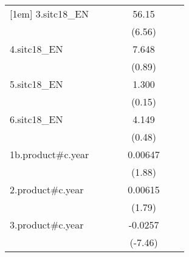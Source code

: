 {\begin{tabular}{l*{6}{c}}
[1em]
3.sitc18\_EN         &                     &                     &                     &       56.15\sym{***}&                     &                     \\
                    &                     &                     &                     &      (6.56)         &                     &                     \\
[1em]
4.sitc18\_EN         &                     &                     &                     &       7.648         &                     &                     \\
                    &                     &                     &                     &      (0.89)         &                     &                     \\
[1em]
5.sitc18\_EN         &                     &                     &                     &       1.300         &                     &                     \\
                    &                     &                     &                     &      (0.15)         &                     &                     \\
[1em]
6.sitc18\_EN         &                     &                     &                     &       4.149         &                     &                     \\
                    &                     &                     &                     &      (0.48)         &                     &                     \\
[1em]
1b.product#c.year   &                     &                     &                     &     0.00647         &                     &                     \\
                    &                     &                     &                     &      (1.88)         &                     &                     \\
[1em]
2.product#c.year    &                     &                     &                     &     0.00615         &                     &                     \\
                    &                     &                     &                     &      (1.79)         &                     &                     \\
[1em]
3.product#c.year    &                     &                     &                     &     -0.0257\sym{***}&                     &                     \\
                    &                     &                     &                     &     (-7.46)         &                     &                     \\

\end{tabular}}
